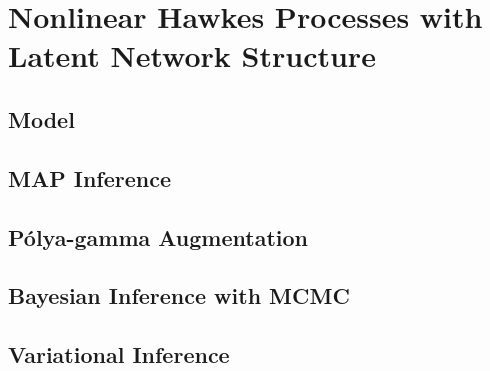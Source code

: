 
\chapter{Nonlinear Hawkes Processes with Latent Network Structure}

\section{Model}

\section{MAP Inference}

\section{P\'{o}lya-gamma Augmentation}

\section{Bayesian Inference with MCMC}

\section{Variational Inference}


